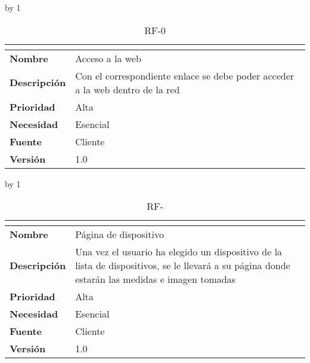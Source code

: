 \advance\rf by 1
\begin{table}[H]
	\caption{RF-0\number\rf}
	\begin{tabular}{|l|p{}|}
		\hline
		\multicolumn{2}{|c|}{\cellcolor[HTML]{BFBFBF}{\color[HTML]{000000} \textbf{RF-0\number\rf}}} \\ \hline
		\textbf{Nombre}      & Acceso a la web                                                               \\ \hline
		\textbf{Descripción} & Con el correspondiente enlace se debe poder acceder a la web dentro de la red \\ \hline
		\textbf{Prioridad}   & Alta                                                                          \\ \hline
		\textbf{Necesidad}   & Esencial                                                                      \\ \hline
		\textbf{Fuente}      & Cliente                                                                       \\ \hline
		\textbf{Versión}     & 1.0                                                                           \\ \hline
	\end{tabular}
\end{table}
\advance\rf by 1
\begin{table}[H]
	\caption{RF-\number\rf}
	\begin{tabular}{|l|p{}|}
		\hline
		\multicolumn{2}{|c|}{\cellcolor[HTML]{BFBFBF}{\color[HTML]{000000} \textbf{RF-\number\rf}}} \\ \hline
		\textbf{Nombre}      & Página de dispositivo                                                                                                                          \\ \hline
		\textbf{Descripción} & Una vez el usuario ha elegido un dispositivo de la lista de dispositivos, se le llevará a su página donde estarán las medidas e imagen tomadas \\ \hline
		\textbf{Prioridad}   & Alta                                                                                                                                           \\ \hline
		\textbf{Necesidad}   & Esencial                                                                                                                                       \\ \hline
		\textbf{Fuente}      & Cliente                                                                                                                                        \\ \hline
		\textbf{Versión}     & 1.0                                                                                                                                            \\ \hline
	\end{tabular}
\end{table}
